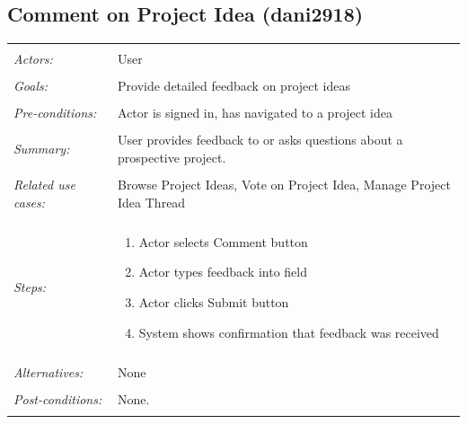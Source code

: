 \documentclass[11pt]{report}
\begin{document}
\subsection{Comment on Project Idea (dani2918)}
\begin{tabular}{ p{2cm} p{12cm} }
 \hline
 \\
 \textit{Actors:} & User \\ 
 \\
 \textit{Goals:} & Provide detailed feedback on project ideas  \\
 \\
 \textit{Pre-conditions:} & Actor is signed in, has navigated to a project idea  \\
 \\
 \textit{Summary:} &  User provides feedback to or asks questions about a prospective project. \\ 
 \\
 \textit{Related use cases:} & Browse Project Ideas, Vote on Project Idea, Manage Project Idea Thread \\ 
 \\
 \textit{Steps:} & \begin{enumerate}
  \item Actor selects Comment button
  \item Actor types feedback into field 
  \item Actor clicks Submit button
  \item System shows confirmation that feedback was received 
 \end{enumerate} \\
 \\
 \textit{Alternatives:} & None \\
 \\
 \textit{Post-conditions:} & None. \\
 \\
\hline 
\end{tabular}
\end{document}
